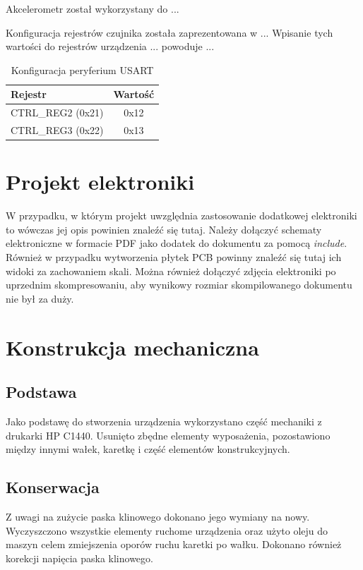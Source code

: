 \documentclass[10pt, a4paper]{article}
\begin{document}
Akcelerometr został wykorzystany do ...

Konfiguracja rejestrów czujnika została zaprezentowana w ...
Wpisanie tych wartości do rejestrów urządzenia ... powoduje ...

\begin{table}[H]
	\centering
	\begin{tabular}{|l|c|} \hline
		\textbf{Rejestr} & Wartość \\
		\hline
		\hline
		CTRL\_REG2 (0x21) & 0x12\\\hline
		CTRL\_REG3 (0x22) & 0x13\\\hline
	\end{tabular}
	\caption{Konfiguracja peryferium USART}
	\label{tab:Akcelerometr}
\end{table}

\section{Projekt elektroniki}



W przypadku, w którym projekt uwzględnia zastosowanie 
dodatkowej elektroniki to wówczas jej opis powinien znaleźć się tutaj.
Należy dołączyć schematy elektroniczne w formacie PDF 
jako dodatek do dokumentu 
za pomocą \textit{include}. Również w przypadku wytworzenia 
płytek PCB powinny znaleźć się tutaj ich widoki za zachowaniem skali.
Można również dołączyć zdjęcia 
elektroniki po uprzednim skompresowaniu, aby wynikowy rozmiar 
skompilowanego dokumentu nie był za duży.
\section{Konstrukcja mechaniczna}

\subsection{Podstawa}
Jako podstawę do stworzenia urządzenia wykorzystano część mechaniki z drukarki HP C1440. Usunięto zbędne elementy wyposażenia, pozostawiono między innymi wałek, karetkę i część elementów konstrukcyjnych.


\subsection{Konserwacja}
Z uwagi na zużycie paska klinowego dokonano jego wymiany na nowy. Wyczyszczono wszystkie elementy ruchome urządzenia oraz użyto oleju do maszyn celem zmiejszenia oporów ruchu karetki po wałku. Dokonano również korekcji napięcia paska klinowego. 
\end{document}
